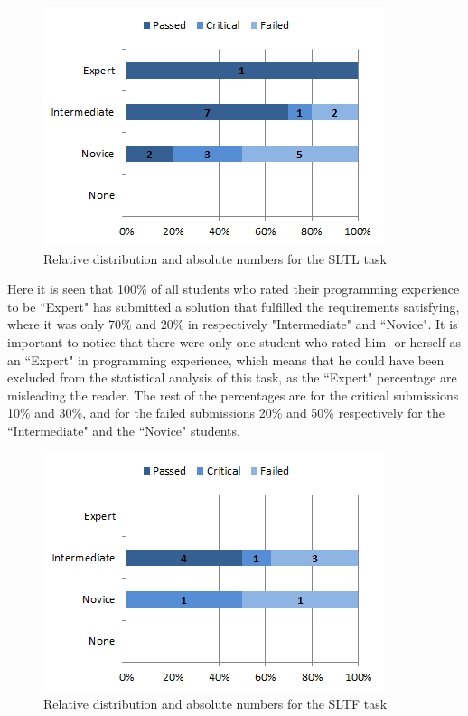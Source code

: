 \documentclass{sig-alternate-05-2015}
\begin{document}
\begin{figure}[!ht]
	\centering
	\includegraphics[width=1\linewidth]{img06}
	\caption{Relative distribution and absolute numbers for the SLTL task}
	\label{fig:SLTL percentage distributions with relative task numbers}
\end{figure}

Here it is seen that 100\% of all students who rated their programming experience to be ``Expert" has submitted a solution that fulfilled the requirements satisfying, where it was only 70\% and 20\% in respectively "Intermediate" and ``Novice".
It is important to notice that there were only one student who rated him- or herself as an ``Expert" in programming experience, which means that he could have been excluded from the statistical analysis of this task, as the ``Expert" percentage are misleading the reader. The rest of the percentages are for the critical submissions 10\% and 30\%, and for the failed submissions 20\% and 50\% respectively for the ``Intermediate" and the ``Novice" students.

\begin{figure}[!ht]
	\centering
	\includegraphics[width=1\linewidth]{img07}
	\caption{Relative distribution and absolute numbers for the SLTF task}
	\label{fig:SLTF percentage distributions with relative task numbers}
\end{figure}
\end{document}
